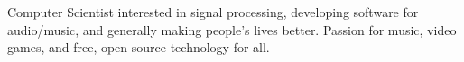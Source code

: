 \documentclass[letter,10pt]{article}
\begin{document}


Computer Scientist interested in signal processing, developing software for audio/music, and generally making people's lives better. Passion for music, video games, and free, open source technology for all.
\end{document}
